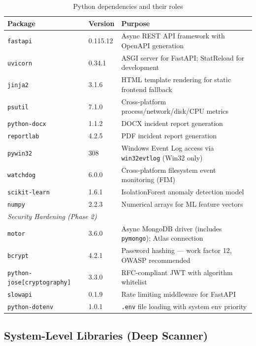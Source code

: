 \documentclass[12pt,a4paper]{article}
\begin{document}
\begin{table}[H]
\centering
\begin{tabularx}{\linewidth}{llX}
\toprule
\textbf{Package} & \textbf{Version} & \textbf{Purpose} \\
\midrule
\texttt{fastapi} & 0.115.12 & Async REST API framework with OpenAPI generation \\
\texttt{uvicorn} & 0.34.1 & ASGI server for FastAPI; StatReload for development \\
\texttt{jinja2} & 3.1.6 & HTML template rendering for static frontend fallback \\
\texttt{psutil} & 7.1.0 & Cross-platform process/network/disk/CPU metrics \\
\texttt{python-docx} & 1.1.2 & DOCX incident report generation \\
\texttt{reportlab} & 4.2.5 & PDF incident report generation \\
\texttt{pywin32} & 308 & Windows Event Log access via \texttt{win32evtlog} (Win32 only) \\
\texttt{watchdog} & 6.0.0 & Cross-platform filesystem event monitoring (FIM) \\
\texttt{scikit-learn} & 1.6.1 & IsolationForest anomaly detection model \\
\texttt{numpy} & 2.2.3 & Numerical arrays for ML feature vectors \\
\midrule
\multicolumn{3}{l}{\textit{Security Hardening (Phase 2)}} \\
\midrule
\texttt{motor} & 3.6.0 & Async MongoDB driver (includes \texttt{pymongo}); Atlas connection \\
\texttt{bcrypt} & 4.2.1 & Password hashing — work factor 12, OWASP recommended \\
\texttt{python-jose[cryptography]} & 3.3.0 & RFC-compliant JWT with algorithm whitelist \\
\texttt{slowapi} & 0.1.9 & Rate limiting middleware for FastAPI \\
\texttt{python-dotenv} & 1.0.1 & \texttt{.env} file loading with system env priority \\
\bottomrule
\end{tabularx}
\caption{Python dependencies and their roles}
\end{table}

\subsection{System-Level Libraries (Deep Scanner)}
\end{document}
